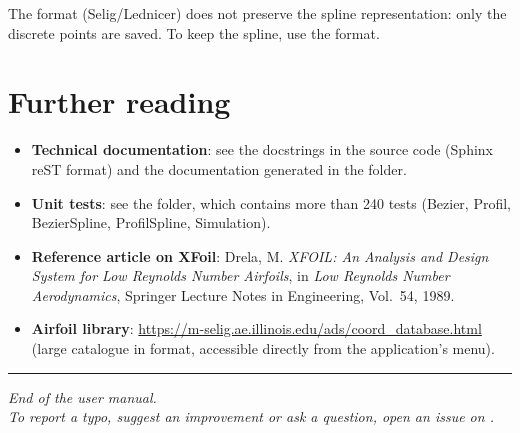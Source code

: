 The  format (Selig/Lednicer) does not preserve the
spline representation: only the discrete points are
saved. To keep the spline, use the
 format.

\section{Further reading}

\begin{itemize}
    \item \textbf{Technical documentation}: see the docstrings
        in the source code (Sphinx reST format) and the documentation
        generated in the  folder.
    \item \textbf{Unit tests}: see the
         folder, which contains more than 240 tests
        (Bezier, Profil, BezierSpline, ProfilSpline,
        Simulation).
    \item \textbf{Reference article on XFoil}:
        Drela, M. \emph{XFOIL: An Analysis and Design System for
        Low Reynolds Number Airfoils}, in \emph{Low Reynolds
        Number Aerodynamics}, Springer Lecture Notes in Engineering,
        Vol.~54, 1989.
    \item \textbf{Airfoil library}:
        \url{https://m-selig.ae.illinois.edu/ads/coord_database.html}
        (large catalogue in  format, accessible
        directly from the application's  menu).

\end{itemize}

\bigskip
\hrule
\bigskip

\begin{center}
    \itshape
    End of the user manual.\\
    To report a typo, suggest an improvement or
    ask a question, open an \emph{issue} on
    .
\end{center}
